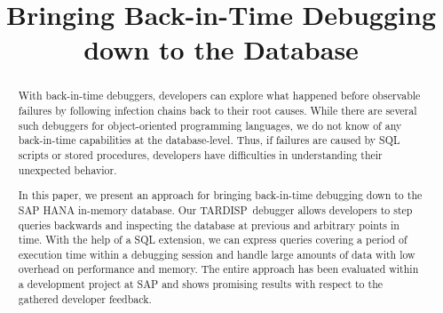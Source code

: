 \documentclass[english,conference]{IEEEtran}
\newcommand{\tool}{TAR\-DISP}
\begin{document}
\title{Bringing Back-in-Time Debugging\\ down to the Database}

\author{
\and
{}
\and
{}
}




\maketitle
\begin{abstract}
With back-in-time debuggers, developers can explore what happened before observable failures by following infection chains back to their root causes.
While there are several such debuggers for object-oriented programming languages, we do not know of any back-in-time capabilities at the database-level.
Thus, if failures are caused by SQL scripts or stored procedures, developers have difficulties in understanding their unexpected behavior.

In this paper, we present an approach for bringing back-in-time debugging down to the SAP HANA in-memory database.
Our \tool\ debugger allows developers to step queries backwards and inspecting the database at previous and arbitrary points in time.
With the help of a SQL extension, we can express queries covering a period of execution time within a debugging session and handle large amounts of data with low overhead on performance and memory.
The entire approach has been evaluated within a development project at SAP and shows promising results with respect to the gathered developer feedback.
\end{abstract}
\end{document}
